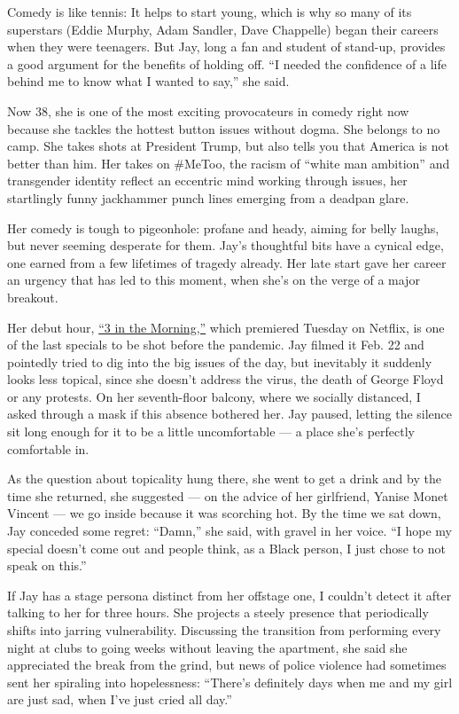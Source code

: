 Comedy is like tennis: It helps to start young, which is why so many of
its superstars (Eddie Murphy, Adam Sandler, Dave Chappelle) began their
careers when they were teenagers. But Jay, long a fan and student of
stand-up, provides a good argument for the benefits of holding off. ``I
needed the confidence of a life behind me to know what I wanted to
say,'' she said.

Now 38, she is one of the most exciting provocateurs in comedy right now
because she tackles the hottest button issues without dogma. She belongs
to no camp. She takes shots at President Trump, but also tells you that
America is not better than him. Her takes on \#MeToo, the racism of
``white man ambition'' and transgender identity reflect an eccentric
mind working through issues, her startlingly funny jackhammer punch
lines emerging from a deadpan glare.

Her comedy is tough to pigeonhole: profane and heady, aiming for belly
laughs, but never seeming desperate for them. Jay's thoughtful bits have
a cynical edge, one earned from a few lifetimes of tragedy already. Her
late start gave her career an urgency that has led to this moment, when
she's on the verge of a major breakout.

Her debut hour, \href{https://www.youtube.com/watch?v=D2EcvFfzu-o}{``3
in the Morning,''} which premiered Tuesday on Netflix, is one of the
last specials to be shot before the pandemic. Jay filmed it Feb. 22 and
pointedly tried to dig into the big issues of the day, but inevitably it
suddenly looks less topical, since she doesn't address the virus, the
death of George Floyd or any protests. On her seventh-floor balcony,
where we socially distanced, I asked through a mask if this absence
bothered her. Jay paused, letting the silence sit long enough for it to
be a little uncomfortable --- a place she's perfectly comfortable in.

As the question about topicality hung there, she went to get a drink and
by the time she returned, she suggested --- on the advice of her
girlfriend, Yanise Monet Vincent --- we go inside because it was
scorching hot. By the time we sat down, Jay conceded some regret:
``Damn,'' she said, with gravel in her voice. ``I hope my special
doesn't come out and people think, as a Black person, I just chose to
not speak on this.''

If Jay has a stage persona distinct from her offstage one, I couldn't
detect it after talking to her for three hours. She projects a steely
presence that periodically shifts into jarring vulnerability. Discussing
the transition from performing every night at clubs to going weeks
without leaving the apartment, she said she appreciated the break from
the grind, but news of police violence had sometimes sent her spiraling
into hopelessness: ``There's definitely days when me and my girl are
just sad, when I've just cried all day.''

